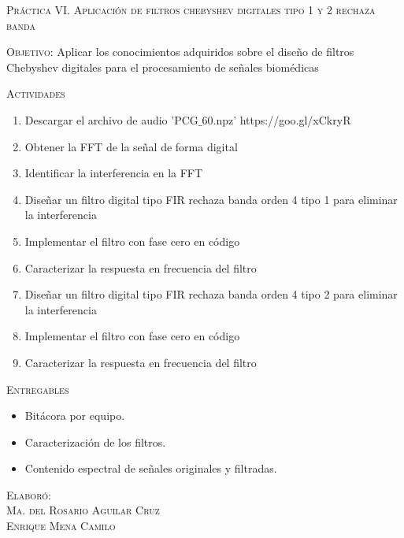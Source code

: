 \documentclass[10pt,letterpaper,spanish,twoside]{report}
\begin{document}
\docdate

\begin{center}
 \textsc{\asignatura}\vspace{.2em}
\end{center}

\textsc{Práctica VI. Aplicación de filtros chebyshev digitales tipo 1 y 2 rechaza banda}

\textsc{Objetivo:} 
Aplicar los conocimientos adquiridos sobre el diseño de filtros Chebyshev digitales para el procesamiento de señales biomédicas

\textsc{Actividades}
\begin{enumerate}
  \item Descargar el archivo de audio 'PCG$\_$60.npz' https://goo.gl/xCkryR
  \item Obtener la FFT de la señal de forma digital
  \item Identificar la interferencia en la FFT
  \item Diseñar un filtro digital tipo FIR rechaza banda orden 4 tipo 1 para eliminar la interferencia
  \item Implementar el filtro con fase cero en código
  \item Caracterizar la respuesta en frecuencia del filtro
  \item Diseñar un filtro digital tipo FIR rechaza banda orden 4 tipo 2 para eliminar la interferencia
  \item Implementar el filtro con fase cero en código
  \item Caracterizar la respuesta en frecuencia del filtro
\end{enumerate}

\textsc{Entregables}
\begin{itemize}
  \item Bitácora por equipo.
  \item Caracterización de los filtros.
  \item Contenido espectral de señales originales y filtradas.
\end{itemize}

\vfill
\begin{flushright}
\textsc{Elaboró:\\
Ma. del Rosario Aguilar Cruz\\
Enrique Mena Camilo}
\end{flushright}
\end{document}
